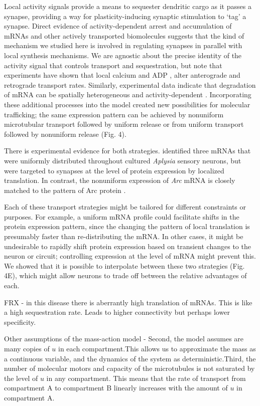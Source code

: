 \documentclass[10pt]{wlpeerj}
\begin{document}
Local activity signals provide a means to sequester dendritic cargo as it passes a synapse, providing a way for plasticity-inducing synaptic stimulation to `tag' a synapse.
Direct evidence of activity-dependent arrest \citep{Soundararajan_2014} and accumulation \citep{Krichevsky_2001,Buxbaum_2014a} of mRNAs and other actively transported biomolecules suggests that the kind of mechanism we studied here is involved in regulating synapses in parallel with local synthesis mechanisms.
We are agnostic about the precise identity of the activity signal that controls transport and sequestration, but note that experiments have shown that local calcium \citep{Wang_2009} and ADP \citep{Mironov_2007}, alter anterograde and retrograde transport rates.
Similarly, experimental data indicate that degradation of mRNA can be spatially heterogeneous and activity-dependent \citep{Farris_2014}.
Incorporating these additional processes into the model created new possibilities for molecular trafficking; the same expression pattern can be achieved by nonuniform microtubular transport followed by uniform release or from uniform transport followed by nonuniform release (Fig. 4).

There is experimental evidence for both strategies. \cite{Kim_2015} identified three mRNAs that were uniformly distributed throughout cultured \textit{Aplysia} sensory neurons, but were targeted to synapses at the level of protein expression by localized translation.
In contrast, the nonuniform expression of \textit{Arc} mRNA is closely matched to the pattern of Arc protein \citep{Farris_2014, Steward_2015}. 

Each of these transport strategies might be tailored for different constraints or purposes.
For example, a uniform mRNA profile could facilitate shifts in the protein expression pattern, since the changing the pattern of local translation is presumably faster than re-distributing the mRNA.
In other cases, it might be undesirable to rapidly shift protein expression based on transient changes to the neuron or circuit; controlling expression at the level of mRNA might prevent this.
We showed that it is possible to interpolate between these two strategies (Fig. 4E), which might allow neurons to trade off between the relative advantages of each.

FRX - in this disease there is aberrantly high translation of mRNAs. This is like a high sequestration rate. Leads to higher connectivity but perhaps lower specificity.

Other assumptions of the mass-action model - Second, the model assumes are many copies of $u$ in each compartment.This allows us to approximate the mass as a continuous variable, and the dynamics of the system as deterministic.Third, the number of molecular motors and capacity of the microtubules is not saturated by the level of $u$ in any compartment. This means that the rate of transport from compartment A to compartment B linearly increases with the amount of $u$ in compartment A.
\end{document}
